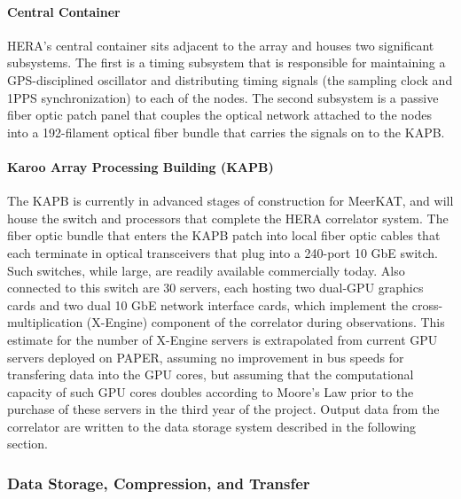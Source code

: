 \documentclass[preprint]{aastex}
\begin{document}
\paragraph{Central Container}

HERA's central container sits adjacent to the array and houses two significant subsystems.  The first is a timing subsystem
that is responsible for maintaining a GPS-disciplined oscillator and distributing timing
signals (the sampling clock and 1PPS synchronization) to each of the nodes.  The second
subsystem is a passive fiber optic patch panel that couples
the optical network attached to the nodes into a 192-filament optical fiber bundle 
that carries the signals on to the KAPB. 

\paragraph{Karoo Array Processing Building (KAPB)}

The KAPB is currently
in advanced stages of construction for MeerKAT, and will house the switch and processors
that 
complete the HERA correlator system.  The fiber optic bundle that enters the KAPB patch
into local fiber optic cables 
that each terminate in optical transceivers that plug into a 240-port 10 GbE switch.
Such switches, while large, are readily available commercially today.  Also connected to
this switch are 30 servers, each hosting two dual-GPU graphics cards and two dual
10 GbE network interface cards, which implement the cross-multiplication (X-Engine) component
of the correlator during observations.  This estimate for the number of X-Engine servers
is extrapolated from current GPU servers deployed on PAPER, assuming no improvement in bus
speeds for transfering data into the GPU cores, but assuming that the computational
capacity of such GPU cores doubles according to Moore's Law prior to the purchase of
these servers in the third year of the project.
Output data from the correlator are written to the data storage system described
in the following section.



\subsubsection{Data Storage, Compression, and Transfer}
\end{document}
